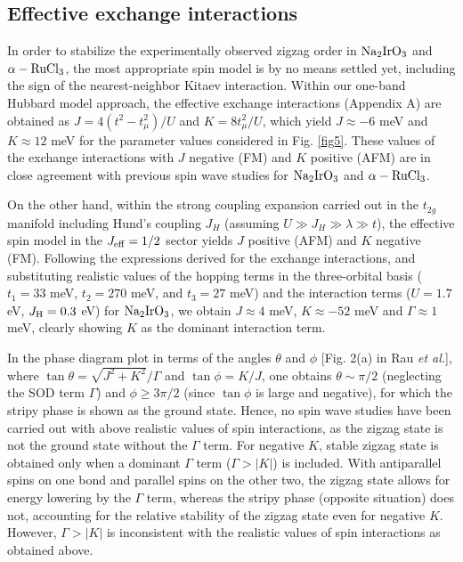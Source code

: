 \documentclass[aps,prb,fleqn,12pt,amsmath,amssymb]{revtex4}
\begin{document}
\subsection{Effective exchange interactions}

In order to stabilize the experimentally observed zigzag order in $\rm Na_2IrO_3$ and $\alpha-\rm{RuCl_3}$, the most appropriate spin model is by no means settled yet, including the sign of the nearest-neighbor Kitaev interaction. Within our one-band Hubbard model approach, the effective exchange interactions (Appendix A) are obtained as $J = 4(t^2 - t^2_\mu)/U$ and $K=8t^2_\mu/U$, which yield $J \approx -6$ meV and $K \approx 12$ meV for the parameter values considered in Fig. \ref{fig5}. These values of the exchange interactions with $J$ negative (FM) and $K$ positive (AFM) are in close agreement with previous spin wave studies for $\rm Na_2IrO_3$ and $\alpha-\rm{RuCl_3}$.\cite{chaloupka_PRL_2013,banerjee_NMAT_2016} 

On the other hand, within the strong coupling expansion carried out in the $t_{2g}$ manifold including Hund's coupling $J_H$ (assuming $U \gg J_H \gg \lambda \gg t$), the effective spin model in the $J_{\rm eff}=1/2$ sector yields $J$ positive (AFM) and $K$ negative (FM).\cite{rau_PRL_2014} Following the expressions derived for the exchange interactions, and substituting realistic values of the hopping terms in the three-orbital basis\cite{rau_PRL_2014} ($t_1 = 33$ meV, $t_2 = 270$ meV, and $t_3 = 27$ meV) and the interaction terms ($U = 1.7$ eV, $J_{\rm H} = 0.3$ eV) for $\rm Na_2IrO_3$,\cite{foyevtsova_PRB_2013, winter_PRB_2016} we obtain $J \approx 4$ meV, $K \approx -52$ meV and $\Gamma \approx 1$ meV, clearly showing $K$ as the dominant interaction term.
  

In the phase diagram plot in terms of the angles $\theta$ and $\phi$ [Fig. 2(a) in Rau {\it et al.}],\cite{rau_PRL_2014} where $\tan \theta = \sqrt{J^2 + K^2}/\Gamma$ and $\tan \phi = K/J$, one obtains $\theta \sim \pi/2$ (neglecting the SOD term $\Gamma$) and $\phi \ge 3 \pi/2$ (since $\tan \phi$ is large and negative), for which the stripy phase is shown as the ground state. Hence, no spin wave studies have been carried out with above realistic values of spin interactions, as the zigzag state is not the ground state without the $\Gamma$ term. For negative $K$, stable zigzag state is obtained only when a dominant $\Gamma$ term ($\Gamma > |K|$) is included.\cite{chaloupka_PRB_2015} With antiparallel spins on one bond and parallel spins on the other two, the zigzag state allows for energy lowering by the $\Gamma$ term, whereas the stripy phase (opposite situation) does not, accounting for the relative stability of the zigzag state even for negative $K$. However, $\Gamma > |K|$ is inconsistent with the realistic values of spin interactions as obtained above.
\end{document}
